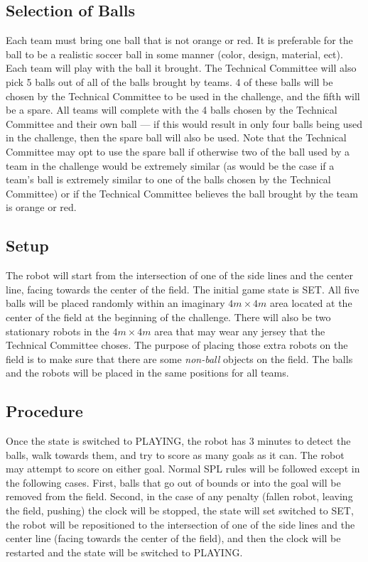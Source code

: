 \documentclass[12pt]{article}
\begin{document}
\subsection{Selection of Balls}

Each team must bring one ball that is not orange or red.  It is preferable for the ball to be a realistic soccer ball in some manner (color, design, material, ect). Each team will play with the ball it brought.  The Technical Committee will also pick 5 balls out of all of the balls brought by teams.  4 of these balls will be chosen by the Technical Committee to be used in the challenge, and the fifth will be a spare.  All teams will complete with the 4 balls chosen by the Technical Committee and their own ball --- if this would result in only four balls being used in the challenge, then the spare ball will also be used.  Note that the Technical Committee may opt to use the spare ball if otherwise two of the ball used by a team in the challenge would be extremely similar (as would be the case if a team's ball is extremely similar to one of the balls chosen by the Technical Committee) or if the Technical Committee believes the ball brought by the team is orange or red.

\subsection{Setup}

The robot will start from the intersection of one of the side lines and the center line, facing towards the center of the field. The initial game state is SET. All five balls will be placed randomly within an imaginary $4m \times 4m$ area located at the center of the field at the beginning of the challenge.  There will also be two stationary robots in the  $4m \times 4m$ area that may wear any jersey that the Technical Committee choses. The purpose of placing those extra robots on the field is to make sure that there are some \emph{non-ball} objects on the field. The balls and the robots will be placed in the same positions for all teams.

\subsection{Procedure}

Once the state is switched to PLAYING, the robot has 3 minutes to detect the balls, walk towards them, and try to score as many goals as it can. The robot may attempt to score on either goal.  Normal SPL rules will be followed except in the following cases.  First, balls that go out of bounds or into the goal will be removed from the field. Second, in the case of any penalty (fallen robot, leaving the field, pushing) the clock will be stopped, the state will set switched to SET, the robot will be repositioned to the intersection of one of the side lines and the center line (facing towards the center of the field), and then the clock will be restarted and the state will be switched to PLAYING.
\end{document}
